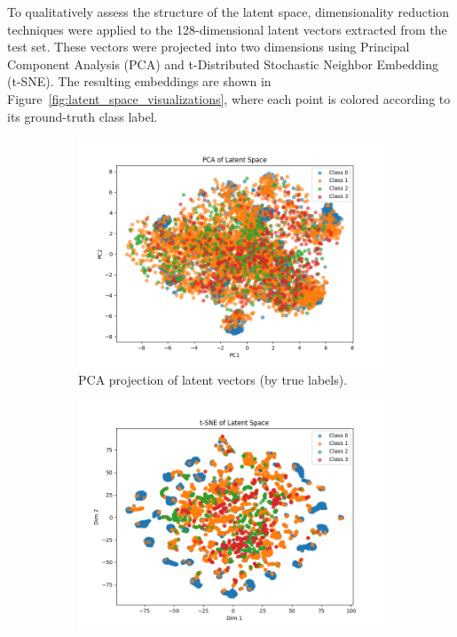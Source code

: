 To qualitatively assess the structure of the latent space, dimensionality reduction techniques were applied to the 128-dimensional latent vectors extracted from the test set. These vectors were projected into two dimensions using Principal Component Analysis (PCA) and t-Distributed Stochastic Neighbor Embedding (t-SNE). The resulting embeddings are shown in Figure~\ref{fig:latent_space_visualizations}, where each point is colored according to its ground-truth class label.

\begin{figure}[htbp]
    \centering
    \begin{subfigure}[b]{0.49\textwidth}
        \includegraphics[width=\textwidth]{img/vae_results/media_images_PCA Latent_0_1f2a94b6feecab3585be.png}
        \caption{PCA projection of latent vectors (by true labels).}
        \label{fig:pca_true}
    \end{subfigure}
    \hfill
    \begin{subfigure}[b]{0.49\textwidth}
        \includegraphics[width=\textwidth]{img/vae_results/media_images_t-SNE Latent_1_77cd107489e31c6c9f4d.png}

\end{subfigure}
\end{figure}
